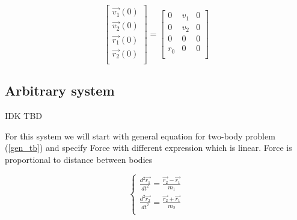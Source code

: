 \documentclass[english,12pt,a4paper]{report}
\begin{document}
	\begin{equation}
		\begin{bmatrix}
			\vec{v_1}(0)\\
			\vec{v_2}(0)\\
			\vec{r_1}(0)\\
			\vec{r_2}(0)\\
		\end{bmatrix}
		=
		\begin{bmatrix}
			0 & v_1 & 0\\
			0 & v_2 & 0\\
			0 & 0 & 0\\
			r_0 & 0 & 0\\
		\end{bmatrix}
	\end{equation}
	
	\subsection{Arbitrary system}
	
	\alert{IDK TBD}
	
	For this system we will start with general equation for two-body problem (\ref{gen_tb}) and specify Force with different expression which is linear.
	Force is proportional to distance between bodies
	
	\begin{equation}\label{gen_tb}
		\begin{cases}
			\frac{d^2\vec{r_1}}{dt^2} = \frac{\vec{r_2}-\vec{r_1}}{m_1} \\
			\frac{d^2\vec{r_2}}{dt^2} = \frac{\vec{r_2}+\vec{r_1}}{m_2} \\
		\end{cases}
	\end{equation}
	
\end{document}
